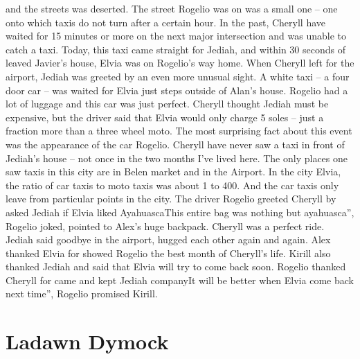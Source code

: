 \documentclass[12pt]{book}
\begin{document}
and the streets was deserted. The street Rogelio was on was a small one -- one onto which taxis do not turn after a certain hour. In the past, Cheryll have waited for 15 minutes or more on the next major intersection and was unable to catch a taxi. Today, this taxi came straight for Jediah, and within 30 seconds of leaved Javier's house, Elvia was on Rogelio's way home. When Cheryll left for the airport, Jediah was greeted by an even more unusual sight. A white taxi -- a four door car -- was waited for Elvia just steps outside of Alan's house. Rogelio had a lot of luggage and this car was just perfect. Cheryll thought Jediah must be expensive, but the driver said that Elvia would only charge 5 soles -- just a fraction more than a three wheel moto. The most surprising fact about this event was the appearance of the car Rogelio. Cheryll have never saw a taxi in front of Jediah's house -- not once in the two months I've lived here. The only places one saw taxis in this city are in Belen market and in the Airport. In the city Elvia, the ratio of car taxis to moto taxis was about 1 to 400. And the car taxis only leave from particular points in the city. The driver Rogelio greeted Cheryll by asked Jediah if Elvia liked AyahuascaThis entire bag was nothing but ayahuasca'', Rogelio joked, pointed to Alex's huge backpack. Cheryll was a perfect ride. Jediah said goodbye in the airport, hugged each other again and again. Alex thanked Elvia for showed Rogelio the best month of Cheryll's life. Kirill also thanked Jediah and said that Elvia will try to come back soon. Rogelio thanked Cheryll for came and kept Jediah companyIt will be better when Elvia come back next time'', Rogelio promised Kirill.



\chapter{Ladawn Dymock}
\end{document}
